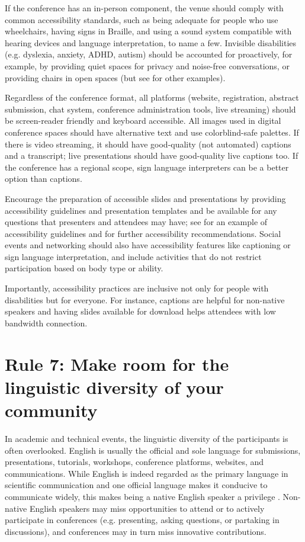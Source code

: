 \documentclass[10pt,letterpaper]{article}
\begin{document}
If the conference has an in-person component, the venue should comply with common accessibility standards, such as being adequate for people who use wheelchairs, having signs in Braille, and using a sound system compatible with hearing devices and language interpretation, to name a few. 
Invisible disabilities (e.g. dyslexia, anxiety, ADHD, autism) should be accounted for proactively, for example, by providing quiet spaces for privacy and noise-free conversations, or providing chairs in open spaces (but see \cite{pun_dos_2016} for other examples).

Regardless of the conference format, all platforms (website, registration, abstract submission, chat system, conference administration tools, live streaming) should be screen-reader friendly and keyboard accessible.
All images used in digital conference spaces should have alternative text and use colorblind-safe palettes.
If there is video streaming, it should have good-quality (not automated) captions and a transcript; live presentations should have good-quality live captions too.
If the conference has a regional scope, sign language interpreters can be a better option than captions.

Encourage the preparation of accessible slides and presentations by providing accessibility guidelines and presentation templates and be available for any questions that presenters and attendees may have; see \cite{sanchez-tapia_user_2021} for an example of accessibility guidelines and \cite{chavez_preparing_2021, sanchez-tapia_making_2021, joo_how_2021} for further accessibility recommendations.
Social events and networking should also have accessibility features like captioning or sign language interpretation, and include activities that do not restrict participation based on body type or ability.

Importantly, accessibility practices are inclusive not only for people with disabilities but for everyone.
For instance, captions are helpful for non-native speakers and having slides available for download helps attendees with low bandwidth connection. 


\section*{Rule 7: Make room for the linguistic diversity of your community}
\label{rule_language}

In academic and technical events, the linguistic diversity of the participants is often overlooked. 
English is usually the official and sole language for submissions, presentations, tutorials, workshops, conference platforms, websites, and communications. 
While English is indeed regarded as the primary language in scientific communication and one official language makes it conducive to communicate widely, this makes being a native English speaker a privilege \cite{amanoTenTipsOvercoming2021}. 
Non-native English speakers may miss opportunities to attend or to actively participate in conferences (e.g. presenting, asking questions, or partaking in discussions),
and conferences may in turn miss innovative contributions.
\end{document}
